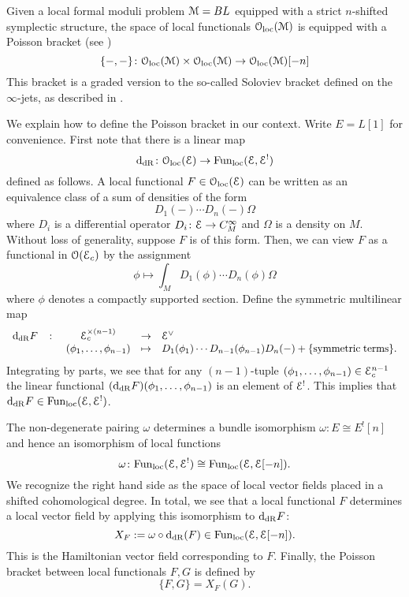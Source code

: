 \documentclass[10pt, oneside]{article}
\begin{document}
Given a local formal moduli problem $\mathcal M = BL$ equipped with a strict $n$-shifted symplectic structure, the space of local functionals $\mathcal{O}_{\rm loc}(\mathcal M)$ is equipped with a Poisson bracket (see \cite[Chapter 5.3]{CostelloBook}) 
\[
\{-,-\}\colon \mathcal{O}_{\rm loc}(\mathcal M) \times \mathcal{O}_{\rm loc}(\mathcal M) \to \mathcal{O}_{\rm loc}(\mathcal M)[-n]
\]
This bracket is a graded version to the so-called Soloviev bracket \cite{Soloviev} defined on the $\infty$-jets, as described in \cite[Section 4]{GetzlerBracket}. 

We explain how to define the Poisson bracket in our context. Write $E = L[1]$ for convenience. First note that there is a linear map
\[
{\rm d}_{\mathrm{dR}} \colon \mathcal{O}_{\rm loc}(\mathcal E) \to {\rm Fun}_{\rm loc}(\mathcal E, \mathcal E^!) 
\]
defined as follows. 
A local functional $F \in  \mathcal{O}_{\rm loc}(\mathcal E)$ can be written as an equivalence class of a sum of densities of the form
\[
D_1(-) \cdots D_n(-) \Omega
\]
where $D_i$ is a differential operator $D_i \colon \mathcal E \to C^\infty_M$ and $\Omega$ is a density on $M$. 
Without loss of generality, suppose $F$ is of this form. 
Then, we can view $F$ as a functional in $\mathcal O(\mathcal E_c)$ by the assignment
\[
\phi \mapsto \int_M D_1(\phi) \cdots D_n(\phi) \Omega
\]
where $\phi$ denotes a compactly supported section. 
Define the symmetric multilinear map
\[
\begin{array}{ccccl}
{\rm d}_{\mathrm{dR}} F & \colon & \mathcal E_c^{\times (n-1)} & \to & \mathcal E^\vee \\
& & (\phi_1, \ldots, \phi_{n-1}) & \mapsto & D_1(\phi_1) \cdots D_{n-1}(\phi_{n-1}) D_{n} (-) + \{{\rm symmetric\;terms}\} .
\end{array}
\]
Integrating by parts, we see that for any $(n-1)$-tuple $(\phi_1, \ldots, \phi_{n-1}) \in \mathcal E_c^{n-1}$ the linear functional $({\rm d}_{\mathrm{dR}} F) (\phi_1,\ldots, \phi_{n-1})$ is an element of $\mathcal E^!$. 
This implies that ${\rm d}_{\mathrm{dR}} F \in {\rm Fun}_{\rm loc}(\mathcal E, \mathcal E^!)$.

The non-degenerate pairing $\omega$ determines a bundle isomorphism $\omega \colon E \cong E^! [n]$ and hence an isomorphism of local functions
\[
\omega \colon {\rm Fun}_{\rm loc}(\mathcal E, \mathcal E^!) \cong {\rm Fun}_{\rm loc}(\mathcal E, \mathcal E[-n]) .
\]
We recognize the right hand side as the space of local vector fields placed in a shifted cohomological degree.
In total, we see that a local functional $F$ determines a local vector field by applying this isomorphism to ${\rm d}_{\mathrm{dR}}F$:
\[
X_F := \omega \circ {\rm d}_{\mathrm{dR}} (F) \in  {\rm Fun}_{\rm loc}(\mathcal E, \mathcal E[-n])  .
\]
This is the Hamiltonian vector field corresponding to $F$. 
Finally, the Poisson bracket between local functionals $F, G$ is defined by
\[
\{F, G\} = X_F (G) .
\]
\end{document}
